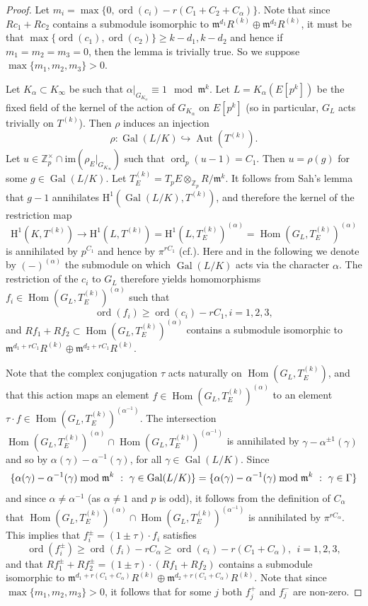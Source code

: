 \documentclass[10pt]{amsart}
\numberwithin{equation}{section}
\theoremstyle{definition}
\theoremstyle{remark}
\newcommand{\Z}{\mathbb{Z}}
\newcommand{\rH}{\mathrm{H}}
\newcommand{\fm}{\mathfrak{m}}
\DeclareMathOperator{\Hom}{Hom}
\DeclareMathOperator{\ord}{ord}
\DeclareMathOperator{\Gal}{Gal}
\DeclareMathOperator{\Aut}{Aut}
\begin{document}
\begin{proof} 
Let $m_i = \max\{0,\ord(c_i) - r(C_1+C_2+C_{\alpha})\}$.
Note that since $R c_1 + R c_2$ contains a submodule isomorphic to $\fm^{d_1}R^{(k)}\oplus \fm^{d_2}R^{(k)}$,
it must be that $\max\{\ord(c_1),\ord(c_2)\}\geqslant k-d_1,k-d_2$ and hence 
if $m_1=m_2=m_3=0$,  
then the lemma is trivially true. So we suppose $\max\{m_1,m_2,m_3\}>0$.

Let $K_{\alpha}\subset K_{\infty}$ be such that $\alpha|_{G_{K_\alpha}}\equiv 1 \mod \fm^k$.
Let $L=K_{\alpha}(E[p^k])$ be the fixed field of the kernel of the action of $G_{K_\alpha}$ on 
$E[p^k]$ (so in particular, $G_L$ acts trivially on $T^{(k)}$). 
Then $\rho$ induces an injection
\[
\rho: \Gal(L/K)\hookrightarrow \Aut(T^{(k)}).
\] 
Let $u\in \Z_p^\times\cap\mathrm{im}(\rho_E|_{G_{K_\infty}})$ such that $\ord_p(u-1) = C_1$. 
Then $u = \rho(g)$ for some $g\in \Gal(L/K)$. Let $T_{E}^{(k)} = T_pE\otimes_{\Z_p} R/\fm^k$. 
It follows from Sah's lemma that $g-1$ annihilates $\rH^1(\Gal(L/K), T^{(k)})$, and therefore the kernel of the restriction map
$$
\rH^1(K,T^{(k)})\rightarrow \rH^1(L,T^{(k)})= \rH^1(L,T_{E}^{(k)})^{(\alpha)}=\Hom(G_L,T_{E}^{(k)})^{(\alpha)}
$$
is annihilated by $p^{C_1}$ and hence by $\pi^{rC_1}$ (cf.\cite[Prop.~(6.1.2)]{nekovar}). 
Here and in the following we denote by $(-)^{(\alpha)}$ the submodule on which $\Gal(L/K)$ acts via the character $\alpha$.
The restriction of the $c_i$ to $G_L$ therefore yields homomorphisms $f_i \in \Hom(G_L,T_E^{(k)})^{(\alpha)}$ such that 
$$
\ord(f_i) \geqslant \ord(c_i) - rC_1, i=1,2,3,
$$
and $Rf_1+Rf_2\subset \Hom(G_L,T_E^{(k)})^{(\alpha)}$ contains a submodule isomorphic to 
$\fm^{d_1+rC_1}R^{(k)}\oplus \fm^{d_2+rC_1}R^{(k)}$.

Note that the complex conjugation $\tau$ acts naturally on $\Hom(G_L,T_E^{(k)})$, 
and that this action maps an element $f\in\Hom(G_L,T_E^{(k)})^{(\alpha)}$ to an element $\tau\cdot f\in \Hom(G_L,T_E^{(k)})^{(\alpha^{-1})}$. 
The intersection $\Hom(G_L,T_E^{(k)})^{(\alpha)}\cap \Hom(G_L,T_E^{(k)})^{(\alpha^{-1})}$
is annihilated by $\gamma-\alpha^{\pm 1}(\gamma)$ and so by $\alpha(\gamma)-\alpha^{-1}(\gamma)$, for all $\gamma\in\Gal(L/K)$.
Since 
\[
\{\alpha(\gamma)-\alpha^{-1}(\gamma)\;{\rm mod}\;\fm^k \ : \ \gamma\in\Gal(L/K)\} = \{\alpha(\gamma)-\alpha^{-1}(\gamma)\;{\rm mod}\;\fm^k \ : \ \gamma\in\Gamma\}
\] 
and since
$\alpha\neq \alpha^{-1}$ (as $\alpha\neq 1$ and $p$ is odd),
it follows from the definition of $C_\alpha$ that  $\Hom(G_L,T_E^{(k)})^{(\alpha)}\cap \Hom(G_L,T_E^{(k)})^{(\alpha^{-1})}$ is annihilated by $\pi^{rC_\alpha}$. This implies that
$f_i^\pm = (1\pm \tau)\cdot f_i$ satisfies
$$
\ord(f_i^\pm) \geqslant \ord(f_i) - rC_\alpha\geqslant{\ord(c_i)-r(C_1+C_\alpha)}, \ \ i=1,2,3,
$$
and that $Rf_1^\pm +R f_2^\pm = (1\pm\tau)\cdot(Rf_1+Rf_2)$ contains a submodule isomorphic to 
$\fm^{d_1+r(C_1+C_\alpha)}R^{(k)}\oplus \fm^{d_2+r(C_1+C_\alpha)}R^{(k)}$.
Note that since $\max\{m_1,m_2,m_3\}>0$, it follows that for some $j$ both $f_j^+$ and $f_j^-$ are non-zero.


\end{proof}
\end{document}

